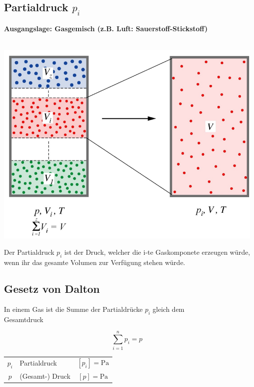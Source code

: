\subsection{Partialdruck $p_i$}
\textbf{Ausgangslage: Gasgemisch (z.B. Luft: Sauerstoff-Stickstoff)} \\
\\

\begin{minipage}{0.48\linewidth}
\includegraphics[width=\linewidth]{Bilder/partialdruck}
\end{minipage}
\hfill
\begin{minipage}{0.5\linewidth}
Der Partialdruck $p_i$ ist der Druck, welcher die i-te Gaskomponete erzeugen würde, wenn ihr das gesamte Volumen zur Verfügung stehen würde. \\
\end{minipage}


\subsection{Gesetz von Dalton}
In einem Gas ist die Summe der Partialdrücke $p_i$ gleich dem \\
Gesamtdruck 

$$ \boxed{ \sum_{i=1}^n  p_i = p } $$ 



\begin{tabular}{c l c}
	$p_i$ & Partialdruck & $[p_i] = \mathrm{Pa}$ \\
	$p$ & (Gesamt-) Druck & $[p] = \mathrm{Pa}$ \\
\end{tabular}


